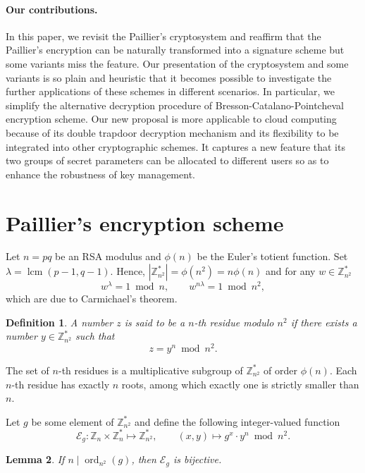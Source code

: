 \documentclass[11pt,a4paper]{article}
\newtheorem{definition}{Definition}[section]
\newtheorem{lemma}[definition]{Lemma}
\theoremstyle{remark}
\newcommand{\Z}{\mathbb{Z}}
\newcommand{\ord}{\operatorname{ord}}
\newcommand{\lcm}{\operatorname{lcm}}
\newcommand{\E}{\mathcal{E}}
\begin{document}
\paragraph{Our contributions.} In this paper, we revisit the Paillier's cryptosystem and reaffirm that the Paillier's encryption can be naturally transformed into a signature scheme but some variants miss the feature. Our presentation of the cryptosystem and some variants is so plain and heuristic that it becomes possible to investigate the further applications of these schemes in different scenarios. In particular, we simplify the alternative decryption procedure of Bresson-Catalano-Pointcheval encryption scheme. Our new proposal is more applicable to cloud computing because of its double trapdoor decryption mechanism and its flexibility to be integrated into other cryptographic schemes. It captures a new feature that its two groups of secret parameters can be allocated to different users so as to enhance the robustness of key management.

\section{Paillier's encryption scheme}\label{sec:paillier}

Let $n=pq$ be an RSA modulus and $\phi(n)$ be the Euler's totient function. Set $\lambda=\lcm(p-1,q-1)$. Hence, $|\Z_{n^2}^*| = \phi(n^2) = n\phi(n)$ and for any $w\in\Z_{n^2}^*$
\[
w^\lambda = 1 \bmod n, \qquad w^{n\lambda} = 1 \bmod n^2,
\]
which are due to Carmichael's theorem.

\begin{definition}\label{def:nth-residue}
A number $z$ is said to be a $n$-th residue modulo $n^2$ if there exists a number $y\in\Z_{n^2}^*$ such that
\[
z = y^n \bmod n^2.
\]
\end{definition}

The set of $n$-th residues is a multiplicative subgroup of $\Z_{n^2}^*$ of order $\phi(n)$. Each $n$-th residue has exactly $n$ roots, among which exactly one is strictly smaller than $n$.

Let $g$ be some element of $\Z_{n^2}^*$ and define the following integer-valued function
\[
\E_g : \Z_n \times \Z_n^* \longmapsto \Z_{n^2}^*, \qquad (x,y) \longmapsto g^x \cdot y^n \bmod n^2.
\]

\begin{lemma}\label{lem:Eg-bijective}
If $n \mid \ord_{n^2}(g)$, then $\E_g$ is bijective.
\end{lemma}
\end{document}
